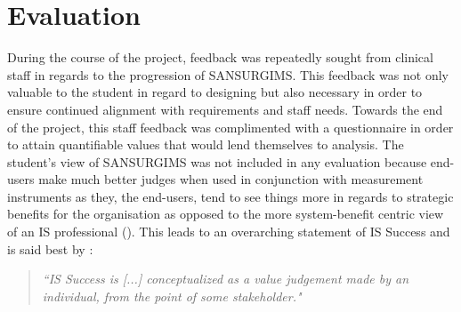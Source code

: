 \section{Evaluation}
During the course of the project, feedback was repeatedly sought from clinical staff in regards to the progression of SANSURGIMS. This feedback was not only valuable to the student in regard to designing but also necessary in order to ensure continued alignment with requirements and staff needs. Towards the end of the project, this staff feedback was complimented with a questionnaire in order to attain quantifiable values that would lend themselves to analysis. The student's view of SANSURGIMS was not included in any evaluation because end-users make much better judges when used in conjunction with measurement instruments as they, the end-users, tend to see things more in regards to strategic benefits for the organisation as opposed to the more system-benefit centric view of an IS professional (\cite{MiraniLederer}). This leads to an overarching statement of IS Success and is said best by \cite{Seddon}:

\begin{quote}
\center\emph{``IS Success is [...] conceptualized as a value judgement made by an individual, from the point of some stakeholder."}
\end{quote}
\vspace{6mm} 
 
